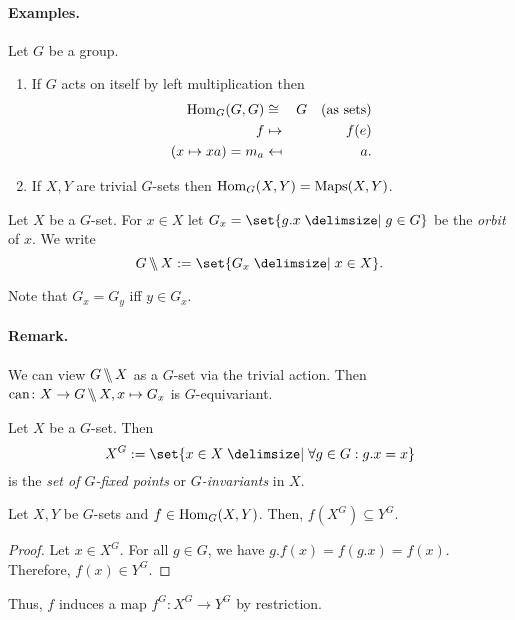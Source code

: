 \documentclass[12pt,a4paper]{scrartcl}
\begin{document}
\begin{otherlanguage}{english}
\paragraph{Examples.}
Let $G$ be a group.
\begin{enumerate}
  \item If $G$ acts on itself by left multiplication then
  \begin{eqnarray*}
    \operatorname{Hom}_G(G,G) &\cong& G \quad\text{(as sets)} \\
    f &\mapsto& f(e) \\
    (x\mapsto xa) = m_a &\mapsfrom& a.
  \end{eqnarray*}
  \item If $X,Y$ are trivial $G$-sets then $\operatorname{Hom}_G(X,Y) = \operatorname{Maps}(X,Y)$.
\end{enumerate}

\begin{defi}
  Let $X$ be a $G$-set. For $x\in X$ let $G_x = \set{g.x \given g \in G}$ be the \emph{orbit} of $x$. We write \[ \orbits GX := \set{G_x \given x \in X}.\]
\end{defi}
\medskip
Note that $G_x = G_y$ iff $y \in G_x$.

\paragraph{Remark.}
We can view $G\,\backslash\!\!\backslash\, X$ as a $G$-set via the trivial action. Then $\operatorname{can}\colon X \to G\,\backslash\!\!\backslash\, X,x \mapsto G_x$ is $G$-equivariant.

\begin{defi}
  Let $X$ be a $G$-set. Then \[X^G := \set{x \in X \given \forall g\in G: g.x = x}\] is the \emph{set of $G$-fixed points} or \emph{$G$-invariants} in $X$.
\end{defi}
\begin{lem}
  Let $X,Y$ be $G$-sets and $f\in \operatorname{Hom}_G(X,Y)$. Then, $f(X^G) \subseteq Y^G$.
\end{lem}
\begin{proof}
  Let $x\in X^G$. For all $g\in G$, we have $g.f(x) = f(g.x) = f(x)$. Therefore, $f(x) \in Y^G$.
\end{proof}

\medskip
Thus, $f$ induces a map $f^G\colon X^G \to Y^G$ by restriction.


\end{otherlanguage}
\end{document}

